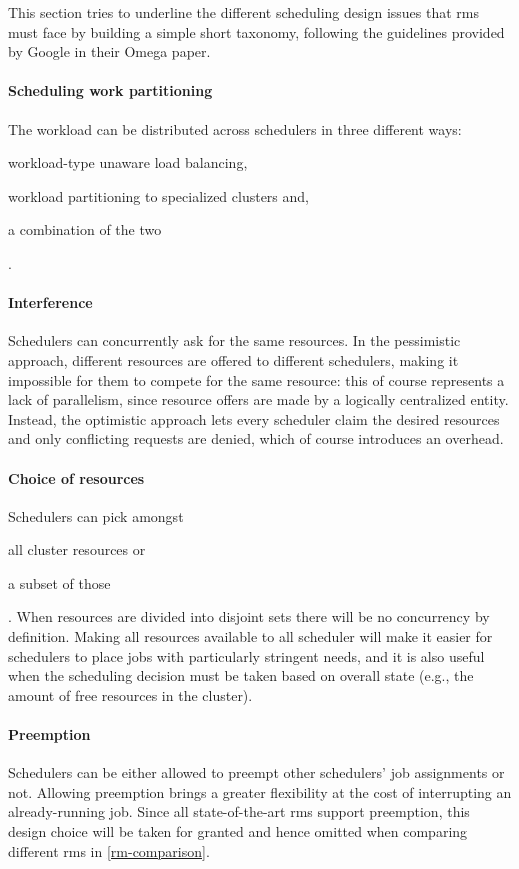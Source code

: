This section tries to underline the different scheduling design issues that \glspl{rm} must face by building a simple short taxonomy, following the guidelines provided by Google in their Omega \cite{omega} paper.

\paragraph{Scheduling work partitioning}
The workload can be distributed across schedulers in three different ways:
\begin{mylist}
    \item workload-type unaware load balancing,
    \item workload partitioning to specialized clusters and,
    \item a combination of the two
\end{mylist}.

\paragraph{Interference}
Schedulers can concurrently ask for the same resources.
In the pessimistic approach, different resources are offered to different schedulers, making it impossible for them to compete for the same resource: this of course represents a lack of parallelism, since resource offers are made by a logically centralized entity.
Instead, the optimistic approach lets every scheduler claim the desired resources and only conflicting requests are denied, which of course introduces an overhead.

\paragraph{Choice of resources}
Schedulers can pick amongst
\begin{mylist}
    \item all cluster resources or 
    \item a subset of those
\end{mylist}.
When resources are divided into disjoint sets there will be no concurrency by definition.
Making all resources available to all scheduler will make it easier for schedulers to place jobs with particularly stringent needs, and it is also useful when the scheduling decision must be taken based on overall state (e.g., the amount of free resources in the cluster).

\paragraph{Preemption}
Schedulers can be either allowed to preempt other schedulers' job assignments or not.
Allowing preemption brings a greater flexibility at the cost of interrupting an already-running job.
Since all state-of-the-art \glspl{rm} support preemption, this design choice will be taken for granted and hence omitted when comparing different \glspl{rm} in \autoref{rm-comparison}.

